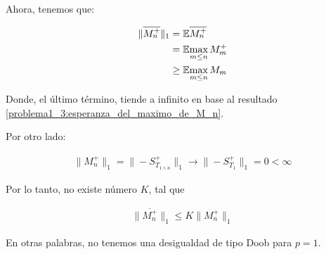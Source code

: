 	Ahora, tenemos que:
    
	\begin{align}
		\|\overline{M_{n}^{+}}\|_1  &=    \mathbb{E}{\overline{M_{n}^{+}}} \\
									&=    \mathbb{E}{\max_{m \leq n}M_m^+} \\
									&\geq \mathbb{E}{\max_{m \leq n}M_m}										
	\end{align}\pn
		
	Donde, el último término, tiende a infinito en base al resultado 
	\eqref{problema1_3:esperanza_del_maximo_de_M_n}.\pn

	Por otro lado:
    
	\begin{align}
		\|M_n^+\|_1=\|-S_{T_{1\wedge n}}^{+}\|_1  \longrightarrow  \|-S_{T_1}^+\|_1 = 0 < \infty
	\end{align}\pn
	
	Por lo tanto, no existe número $K$, tal que
	
    \begin{align}
		 \|\overline{M_n^+}\|_1 \leq  K \|M_n^+\|_1
	\end{align}\pn
	
	En otras palabras, no tenemos una desigualdad de tipo Doob para $p=1$.
